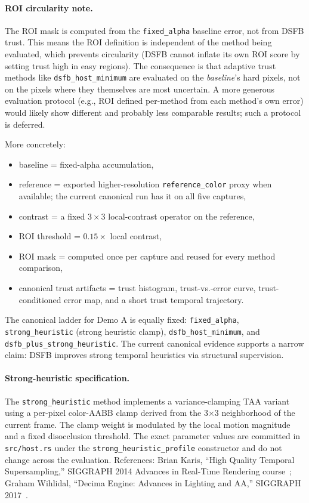 \documentclass[11pt,letterpaper]{article}
\theoremstyle{gcresult}
\theoremstyle{definition}
\begin{document}
\paragraph{ROI circularity note.}
The ROI mask is computed from the \texttt{fixed\_alpha} baseline error, not from DSFB trust. This means the ROI definition is independent of the method being evaluated, which prevents circularity (DSFB cannot inflate its own ROI score by setting trust high in easy regions). The consequence is that adaptive trust methods like \texttt{dsfb\_host\_minimum} are evaluated on the \emph{baseline}'s hard pixels, not on the pixels where they themselves are most uncertain. A more generous evaluation protocol (e.g., ROI defined per-method from each method's own error) would likely show different and probably less comparable results; such a protocol is deferred.

More concretely:
\begin{itemize}[leftmargin=1.5em]
    \item baseline = fixed-alpha accumulation,
    \item reference = exported higher-resolution \texttt{reference\_color} proxy when available; the current canonical run has it on all five captures,
    \item contrast = a fixed 3\,$\times$\,3 local-contrast operator on the reference,
    \item ROI threshold = $0.15 \times$ local contrast,
    \item ROI mask = computed once per capture and reused for every method comparison,
    \item canonical trust artifacts = trust histogram, trust-vs.-error curve, trust-conditioned error map, and a short trust temporal trajectory.
\end{itemize}

The canonical ladder for Demo A is equally fixed: \texttt{fixed\_alpha}, \texttt{strong\_heuristic} (strong heuristic clamp), \texttt{dsfb\_host\_minimum}, and \texttt{dsfb\_plus\_strong\_heuristic}.
The current canonical evidence supports a narrow claim: DSFB improves strong temporal heuristics via structural supervision.

\paragraph{Strong-heuristic specification.}
The \texttt{strong\_heuristic} method implements a variance-clamping TAA variant using a per-pixel color-AABB clamp derived from the 3$\times$3 neighborhood of the current frame. The clamp weight is modulated by the local motion magnitude and a fixed disocclusion threshold. The exact parameter values are committed in \texttt{src/host.rs} under the \texttt{strong\_heuristic\_profile} constructor and do not change across the evaluation. References: Brian Karis, ``High Quality Temporal Supersampling,'' SIGGRAPH 2014 Advances in Real-Time Rendering course~\cite{karis2014}; Graham Wihlidal, ``Decima Engine: Advances in Lighting and AA,'' SIGGRAPH 2017~\cite{wihlidal2017}.
\end{document}
